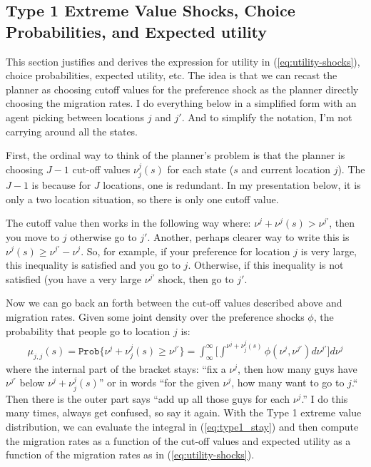 \documentclass[pdftex,11pt]{article}
\begin{document}
\subsection{Type 1 Extreme Value Shocks, Choice Probabilities, and Expected utility}

This section justifies and derives the expression for utility in (\ref{eq:utility-shocks}), choice probabilities, expected utility, etc. The idea is that we can recast the planner as choosing cutoff values for the preference shock as the planner directly choosing the migration rates. I do everything below in a simplified form with an agent picking between locations $j$ and $j'$. And to simplify the notation, I'm not carrying around all the states.

First, the ordinal way to think of the planner's problem is that the planner is choosing $J-1$ cut-off values $\nu_j^{j}(s)$ for each state ($s$ and current location $j$). The $J-1$ is because for $J$ locations, one is redundant. In my presentation below, it is only a two location situation, so there is only one cutoff value.

The cutoff value then works in the following way where: $\nu^{j} + \nu^{j}(s) > \nu^{j'}$, then you move to $j$ otherwise go to $j'$. Another, perhaps clearer way to write this is $\nu^{j}(s) \geq \nu^{j'} - \nu^{j}$. So, for example, if your preference for location $j$ is very large, this inequality is satisfied and you go to $j$. Otherwise, if this inequality is not satisfied (you have a very large $\nu^{j'}$ shock, then go to $j'$.

Now we can go back an forth between the cut-off values described above and migration rates. Given some joint density over the preference shocks $\phi$, the probability that people go to location $j$ is:
\begin{align}
\mu_{j,j}(s)  = \mathtt{Prob}\{ \nu^{j} + \nu_j^{j}(s) \geq \nu^{j'} \} = \int_{\infty}^{\infty} \bigg [ \int^{\nu^{j} + \nu_j^{j}(s)} \phi(\nu^{j},\nu^{j'})d\nu^{j'} \bigg ] d\nu^{j}
\label{eq:type1_stay}
\end{align}
where the internal part of the bracket stays: ``fix a $\nu^j$, then how many guys have $\nu^{j'}$ below $\nu^j + \nu_j^{j}(s)$'' or in words ``for the given $\nu^j$, how many want to go to $j$.`` Then there is the outer part says ``add up all those guys for each $\nu^{j}$.'' I do this many times, always get confused, so say it again. With the Type 1 extreme value distribution, we can evaluate the integral in (\ref{eq:type1_stay}) and then compute the migration rates as a function of the cut-off values and expected utility as a function of the migration rates as in (\ref{eq:utility-shocks}).
\end{document}
